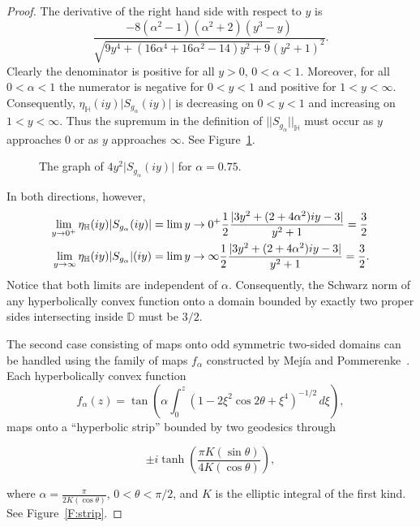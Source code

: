 \documentclass{lms}
\newcommand{\D}{\mathbb D}
\newcommand{\HH}{\mathbb H}
\newcommand{\abs}[1]{\lvert#1\rvert}
\newcommand{\norm}[1]{\lvert\lvert#1\rvert\rvert}
\numberwithin{equation}{section}
\begin{document}
\begin{proof}
The derivative of the right hand side with respect to $y$ is
\[
\frac{-8(\alpha^2-1)(\alpha^2+2)(y^3-y)}
{\sqrt{9y^4+(16\alpha^4+16\alpha^2-14)y^2 +9}(y^2+1)^2}.
\]
Clearly the denominator is positive for all $y>0$, $0<\alpha<1$.
Moreover, for all $0<\alpha<1$ the numerator is negative for 
$0<y<1$ and positive for $1<y<\infty$.  
Consequently, $\eta_\HH(iy)\abs{S_{g_\alpha}(iy)}$ is decreasing 
on $0<y<1$ and increasing on $1<y<\infty$.
Thus the supremum in
the definition of $\norm{S_{g_\alpha}}_\HH$ must occur as $y$ approaches $0$
or as $y$ approaches $\infty$.  See Figure~\ref{F:g-alpha}.


\begin{figure}
\begin{center}
\caption{The graph of $4y^2\abs{S_{g_\alpha}(iy)}$ for $\alpha=0.75$.}
\label{F:g-alpha}
\end{center}
\end{figure}

In both directions, however,
\begin{align}
\lim_{y\to 0^+}\eta_\HH(iy)\abs{S_{g_\alpha}(iy)} & = 
\lim{y\to 0^+} \frac{1}{2}\frac{\abs{3y^2+(2+4\alpha^2)iy -3}}{y^2+1} 
=\frac{3}{2}\\\notag
\lim_{y\to \infty}\eta_\HH(iy)\abs{S_{g_\alpha}}(iy) & = 
\lim{y\to \infty} \frac{1}{2}\frac{\abs{3y^2+(2+4\alpha^2)iy -3}}{y^2+1} 
=\frac{3}{2}.
\end{align}
Notice that both limits are independent of $\alpha$.  Consequently, 
the Schwarz norm of any hyperbolically convex function onto a domain
bounded by exactly two proper sides intersecting inside $\D$ must be $3/2$.

The second case consisting of maps onto odd symmetric two-sided domains
can be handled using the family of maps 
$f_\alpha$ constructed by Mej\'ia and Pommerenke~\cite{PM00}.
Each hyperbolically convex function
\[
f_\alpha(z)=\tan\left( \alpha\int_0^z \left(1-2\xi^2\cos 2\theta+\xi^4
\right)^{-1/2}\,d\xi \right),
\]
maps onto a ``hyperbolic strip''
bounded by two geodesics through 

$$
\pm i \tanh \left(\frac{\pi K(\sin\theta)}{4K(\cos\theta)}\right),
$$

\noindent where  $\alpha  = \frac{\pi}{2K(\cos \theta)}$, $0<\theta<\pi/2$,
and $K$ is the elliptic integral of the first kind.
See Figure~\ref{F:strip}.



\end{proof}
\end{document}
